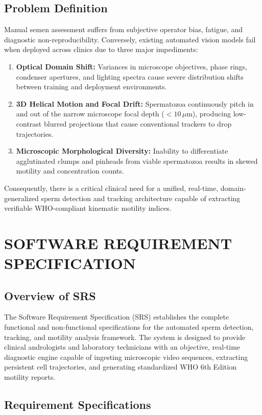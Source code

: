 \documentclass[12pt,a4paper]{report}
\begin{document}
\section{Problem Definition}
Manual semen assessment suffers from subjective operator bias, fatigue, and diagnostic non-reproducibility. Conversely, existing automated vision models fail when deployed across clinics due to three major impediments:
\begin{enumerate}
    \item \textbf{Optical Domain Shift:} Variances in microscope objectives, phase rings, condenser apertures, and lighting spectra cause severe distribution shifts between training and deployment environments.
    \item \textbf{3D Helical Motion and Focal Drift:} Spermatozoa continuously pitch in and out of the narrow microscope focal depth ($<10\,\mu\text{m}$), producing low-contrast blurred projections that cause conventional trackers to drop trajectories.
    \item \textbf{Microscopic Morphological Diversity:} Inability to differentiate agglutinated clumps and pinheads from viable spermatozoa results in skewed motility and concentration counts.
\end{enumerate}
Consequently, there is a critical clinical need for a unified, real-time, domain-generalized sperm detection and tracking architecture capable of extracting verifiable WHO-compliant kinematic motility indices.

\chapter{SOFTWARE REQUIREMENT SPECIFICATION}

\section{Overview of SRS}
The Software Requirement Specification (SRS) establishes the complete functional and non-functional specifications for the automated sperm detection, tracking, and motility analysis framework. The system is designed to provide clinical andrologists and laboratory technicians with an objective, real-time diagnostic engine capable of ingesting microscopic video sequences, extracting persistent cell trajectories, and generating standardized WHO 6th Edition motility reports.

\section{Requirement Specifications}
\end{document}
